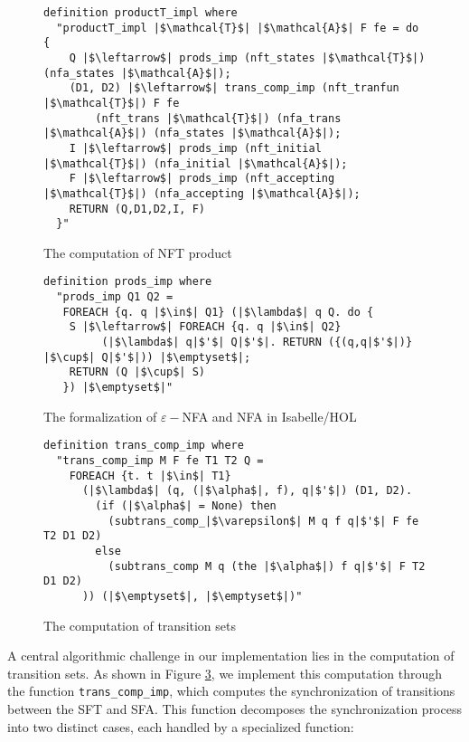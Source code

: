 \documentclass[a4paper,UKenglish,cleveref, autoref, anonymous, thm-restate]{lipics-v2021}
\begin{document}
\begin{figure}[hbt!]
	\begin{lstlisting}
definition productT_impl where
  "productT_impl |$\mathcal{T}$| |$\mathcal{A}$| F fe = do {
    Q |$\leftarrow$| prods_imp (nft_states |$\mathcal{T}$|) (nfa_states |$\mathcal{A}$|);
    (D1, D2) |$\leftarrow$| trans_comp_imp (nft_tranfun |$\mathcal{T}$|) F fe 
        (nft_trans |$\mathcal{T}$|) (nfa_trans |$\mathcal{A}$|) (nfa_states |$\mathcal{A}$|);
    I |$\leftarrow$| prods_imp (nft_initial |$\mathcal{T}$|) (nfa_initial |$\mathcal{A}$|);
    F |$\leftarrow$| prods_imp (nft_accepting |$\mathcal{T}$|) (nfa_accepting |$\mathcal{A}$|);
    RETURN (Q,D1,D2,I, F)
  }"
\end{lstlisting}
\caption{The computation of NFT product}
\label{fig-compute-nft-product}
\end{figure}



\begin{figure}[hbt!]
	\begin{lstlisting}
definition prods_imp where
  "prods_imp Q1 Q2 =
   FOREACH {q. q |$\in$| Q1} (|$\lambda$| q Q. do {
    S |$\leftarrow$| FOREACH {q. q |$\in$| Q2}
         (|$\lambda$| q|$'$| Q|$'$|. RETURN ({(q,q|$'$|)} |$\cup$| Q|$'$|)) |$\emptyset$|;
    RETURN (Q |$\cup$| S)
   }) |$\emptyset$|"
\end{lstlisting}
\caption{The formalization of $\varepsilon-$NFA and NFA in Isabelle/HOL}
\label{fig-def-prods_imp}
\end{figure}



\begin{figure}[hbt!]
	\begin{lstlisting}
definition trans_comp_imp where
  "trans_comp_imp M F fe T1 T2 Q =
    FOREACH {t. t |$\in$| T1}
      (|$\lambda$| (q, (|$\alpha$|, f), q|$'$|) (D1, D2). 
        (if (|$\alpha$| = None) then 
          (subtrans_comp_|$\varepsilon$| M q f q|$'$| F fe T2 D1 D2)
        else 
          (subtrans_comp M q (the |$\alpha$|) f q|$'$| F T2 D1 D2)
      )) (|$\emptyset$|, |$\emptyset$|)"
\end{lstlisting}
\caption{The computation of transition sets}
\label{fig-def-prods-imp}
\end{figure}

A central algorithmic challenge in our implementation lies in the computation of transition sets. As shown in Figure \ref{fig-def-prods-imp}, we implement this computation through the function \texttt{trans\_comp\_imp}, which computes the synchronization of transitions between the SFT and SFA. This function decomposes the synchronization process into two distinct cases, each handled by a specialized function:
\end{document}
